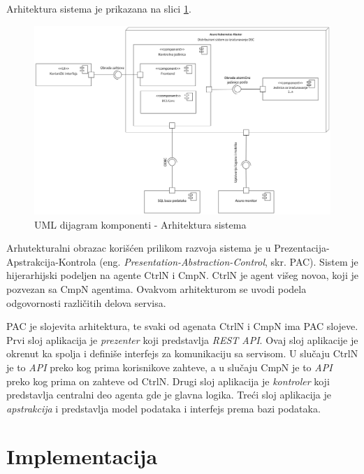 \documentclass[12pt,oneside]{memoir}
\begin{document}
Arhitektura sistema je prikazana na slici \ref{fig:arhitektura}.

\begin{figure}[!ht]
  \centering
  \includegraphics[width=1.0\textwidth]{./images/arhitektura_sistema_dijagram_komponenti.png}
  \caption{UML dijagram komponenti - Arhitektura sistema}
  \label{fig:arhitektura}
\end{figure}

Arhutekturalni obrazac korišćen prilikom razvoja sistema je u Prezentacija-Apstrakcija-Kontrola (eng. \emph{Presentation-Abstraction-Control}, skr. PAC). Sistem je hijerarhijski podeljen na agente CtrlN i CmpN. CtrlN je agent višeg novoa, koji je pozvezan sa CmpN agentima. Ovakvom arhitekturom se uvodi podela odgovornosti različitih delova servisa.

PAC je slojevita arhitektura, te svaki od agenata CtrlN i CmpN ima PAC slojeve. Prvi sloj aplikacija je \emph{prezenter} koji predstavlja \emph{REST API}. Ovaj sloj aplikacije je okrenut ka spolja i definiše interfejs za komunikaciju sa servisom. U slučaju CtrlN je to \emph{API} preko kog prima korisnikove zahteve, a u slučaju CmpN je to \emph{API} preko kog prima on zahteve od CtrlN. Drugi sloj aplikacija je \emph{kontroler} koji predstavlja centralni deo agenta gde je glavna logika. Treći sloj aplikacija je \emph{apstrakcija} i predstavlja model podataka i interfejs prema bazi podataka. 


\section{Implementacija}
\label{sec:implementacija}
\end{document}
